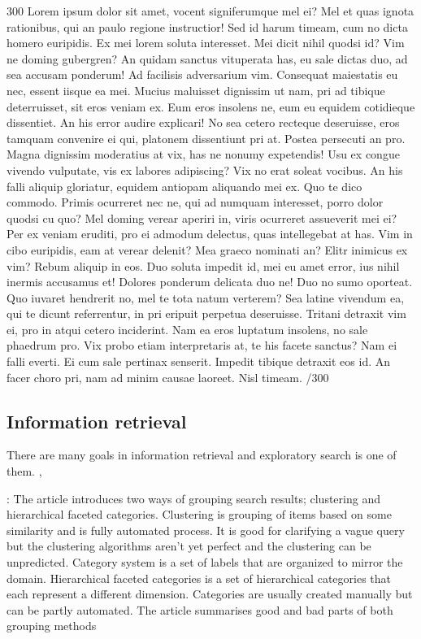 \documentclass{sigchi}
\begin{document}
300 Lorem ipsum dolor sit amet, vocent signiferumque mel ei? Mel et quas ignota rationibus, qui an paulo regione instructior! Sed id harum timeam, cum no dicta homero euripidis. Ex mei lorem soluta interesset. Mei dicit nihil quodsi id? Vim ne doming gubergren? An quidam sanctus vituperata has, eu sale dictas duo, ad sea accusam ponderum! Ad facilisis adversarium vim. Consequat maiestatis eu nec, essent iisque ea mei. Mucius maluisset dignissim ut nam, pri ad tibique deterruisset, sit eros veniam ex. Eum eros insolens ne, eum eu equidem cotidieque dissentiet. An his error audire explicari! No sea cetero recteque deseruisse, eros tamquam convenire ei qui, platonem dissentiunt pri at. Postea persecuti an pro. Magna dignissim moderatius at vix, has ne nonumy expetendis! Usu ex congue vivendo vulputate, vis ex labores adipiscing? Vix no erat soleat vocibus. An his falli aliquip gloriatur, equidem antiopam aliquando mei ex. Quo te dico commodo. Primis ocurreret nec ne, qui ad numquam interesset, porro dolor quodsi cu quo? Mel doming verear aperiri in, viris ocurreret assueverit mei ei? Per ex veniam eruditi, pro ei admodum delectus, quas intellegebat at has. Vim in cibo euripidis, eam at verear delenit? Mea graeco nominati an? Elitr inimicus ex vim? Rebum aliquip in eos. Duo soluta impedit id, mei eu amet error, ius nihil inermis accusamus et! Dolores ponderum delicata duo ne! Duo no sumo oporteat. Quo iuvaret hendrerit no, mel te tota natum verterem? Sea latine vivendum ea, qui te dicunt referrentur, in pri eripuit perpetua deseruisse. Tritani detraxit vim ei, pro in atqui cetero inciderint. Nam ea eros luptatum insolens, no sale phaedrum pro. Vix probo etiam interpretaris at, te his facete sanctus? Nam ei falli everti. Ei cum sale pertinax senserit. Impedit tibique detraxit eos id. An facer choro pri, nam ad minim causae laoreet. Nisl timeam. /300

\subsection{Information retrieval}
There are many goals in information retrieval and exploratory search is one of them.
\cite{hearst02}, \cite{kuhlt91}

\cite{hearst06}: The article introduces two ways of grouping search results; clustering and hierarchical faceted categories. Clustering is grouping of items based on some similarity and is fully automated process. It is good for clarifying a vague query but the clustering algorithms aren't yet perfect and the clustering can be unpredicted. Category system is a set of labels that are organized to mirror the domain. Hierarchical faceted categories is a set of hierarchical categories that each represent a different dimension. Categories are usually created manually but can be partly automated. The article summarises good and bad parts of both grouping methods
\end{document}
